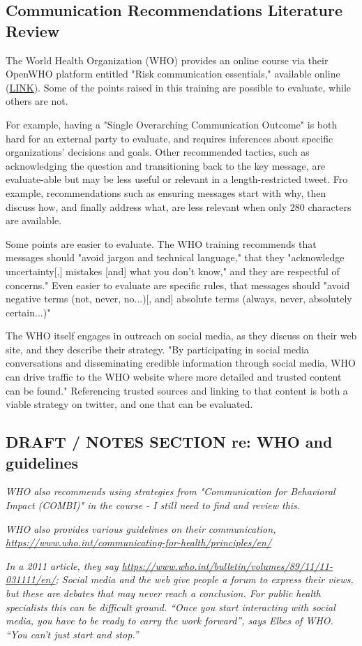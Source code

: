 \documentclass{article}
\begin{document}
\subsection{Communication Recommendations Literature Review}
The World Health Organization (WHO) provides an online course via their OpenWHO platform entitled "Risk communication essentials," available online (\href{https://openwho.org/courses/risk-communication}{LINK})\cite{OpenWHORiskComm2017}. Some of the points raised in this training are possible to evaluate, while others are not. 
 
For example, having a "Single Overarching Communication Outcome" is both hard for an external party to evaluate, and requires inferences about specific organizations' decisions and goals. Other recommended tactics, such as acknowledging the question and transitioning back to the key message, are evaluate-able but may be less useful or relevant in a length-restricted tweet. Fro example, recommendations such as ensuring messages start with why, then discuss how, and finally address what, are less relevant when only 280 characters are available.

Some points are easier to evaluate. The WHO training recommends that messages should "avoid jargon and technical language," that they "acknowledge uncertainty[,] mistakes [and] what you don't know," and they are respectful of concerns." Even easier to evaluate are specific rules, that messages should "avoid negative terms (not, never, no...)[, and] absolute terms (always, never, absolutely certain...)"

The WHO itself engages in outreach on social media, as they discuss on their web site\cite{WHOWebSocialMedia}, and they describe their strategy. "By participating in social media conversations and disseminating credible information through social media, WHO can drive traffic to the WHO website where more detailed and trusted content can be found." Referencing trusted sources and linking to that content is both a viable strategy on twitter, and one that can be evaluated.


\subsection{DRAFT / NOTES SECTION re: WHO and guidelines}
{ \textit{WHO also recommends using strategies from "Communication for Behavioral Impact (COMBI)" in the course - I still need to find and review this.} }

{ \textit{WHO also provides various guidelines on their communication\cite{WHOWebHealthComm},  \url{https://www.who.int/communicating-for-health/principles/en/} }

\textit{In a 2011 article, they say \url{https://www.who.int/bulletin/volumes/89/11/11-031111/en/};
Social media and the web give people a forum to express their views, but these are debates that may never reach a conclusion. For public health specialists this can be difficult ground. “Once you start interacting with social media, you have to be ready to carry the work forward”, says Elbes of WHO. “You can't just start and stop.”}
}
\end{document}
